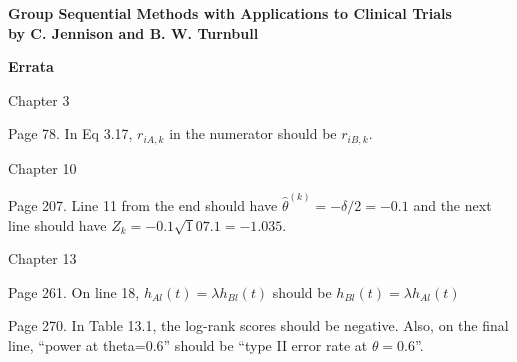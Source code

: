\documentclass[12pt]{article}
\begin{document}
\begin{center}
{\large \bf Group Sequential Methods with Applications to Clinical Trials \\ [0.15in]
by C. Jennison and B. W. Turnbull}
\end{center}

\bigskip
{\bf Errata}

\medskip
Chapter 3

\medskip
Page 78. In Eq 3.17, $r_{iA,k}$ in the numerator should be $r_{iB,k}$.

\medskip
Chapter 10

\medskip
Page 207. Line 11 from the end should have $\hat\theta^{(k)} = -\delta/2 = -0.1$
and the next line should have $Z_k = -0.1\surd 107.1 = -1.035$.

\medskip
Chapter 13

\medskip
Page 261. On line 18, $h_{Al}(t) = \lambda h_{Bl}(t)$ should be $h_{Bl}(t) = \lambda h_{Al}(t)$

\medskip
Page 270. In Table 13.1, the log-rank scores should be negative. Also, on the final
line, ``power at theta=0.6'' should be ``type II error rate at $\theta = 0.6$''.
\end{document}
